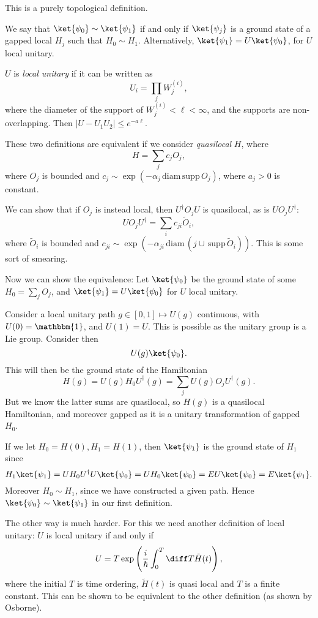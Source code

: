 \documentclass[12pt]{article}
\begin{document}
This is a purely topological definition.

We say that $\ket{\psi_0} \sim \ket{\psi_1}$ if and only if $\ket{\psi_j}$ is a ground state of a gapped local $H_j$ such that $H_0 \sim H_1$. Alternatively, $\ket{\psi_1} = U \ket{\psi_0}$, for $U$ local unitary.

$U$ is \emph{local unitary} if it can be written as
\[
U_i = \prod_{j} W_j^{(i)},
\]
where the diameter of the support of $W_j^{(i)} < \ell < \infty$, and the supports are non-overlapping. Then $|U - U_1U_2| \leq e^{-a \ell}$.

These two definitions are equivalent if we consider \emph{quasilocal} $H$, where
\[
H = \sum_j c_j O_j,
\]
where $O_j$ is bounded and $c_j \sim \exp (- \alpha_j \, \mathrm{diam} \, \mathrm{supp} \, O_j)$, where $a_j > 0$ is constant.

We can show that if $O_j$ is instead local, then $U^{\dagger} O_j U$ is quasilocal, as is $U O_j U^{\dagger}$:
\[
U O_j U^{\dagger} = \sum_{i} c_{ji} \tilde O_{i},
\]
where $\tilde O_i$ is bounded and $c_{ji} \sim \exp (- \alpha_{ji} \, \mathrm{diam} \, (j \cup \, \mathrm{supp} \, \tilde O_i))$. This is some sort of smearing.

Now we can show the equivalence: Let $\ket{\psi_0}$ be the ground state of some $H_0 = \sum_j O_j$, and $\ket{\psi_1} = U \ket{\psi_0}$ for $U$ local unitary.

Consider a local unitary path $g \in [0, 1] \mapsto U(g)$ continuous, with $U(0) = \mathbbm{1}$, and $U(1) = U$. This is possible as the unitary group is a Lie group. Consider then
\[
	U(g) \ket {\psi_0}.
\]
This will then be the ground state of the Hamiltonian
\[
H(g) = U(g) H_0 U^{\dagger}(g) = \sum_j U(g) O_j U^{\dagger}(g).
\]
But we know the latter sums are quasilocal, so $H(g)$ is a quasilocal Hamiltonian, and moreover gapped as it is a unitary transformation of gapped $H_0$.

If we let $H_0 = H(0), H_1 = H(1)$, then $\ket{\psi_1}$ is the ground state of $H_1$ since
\[
	H_1 \ket{\psi_1} = U H_0 U^{\dagger} U \ket{\psi_0} = U H_0 \ket{\psi_0} = E U \ket {\psi_0} = E \ket{\psi_1}.
\]
Moreover $H_0 \sim H_1$, since we have constructed a given path. Hence $\ket{\psi_0} \sim \ket{\psi_1}$ in our first definition.

The other way is much harder. For this we need another definition of local unitary: $U$ is local unitary if and only if
\[
U = T \exp \left( \frac{i}{\hbar} \int_0^{T} \diff T \tilde H(t) \right),
\]
where the initial $T$ is time ordering, $\tilde H(t)$ is quasi local and $T$ is a finite constant. This can be shown to be equivalent to the other definition (as shown by Osborne).
\end{document}
